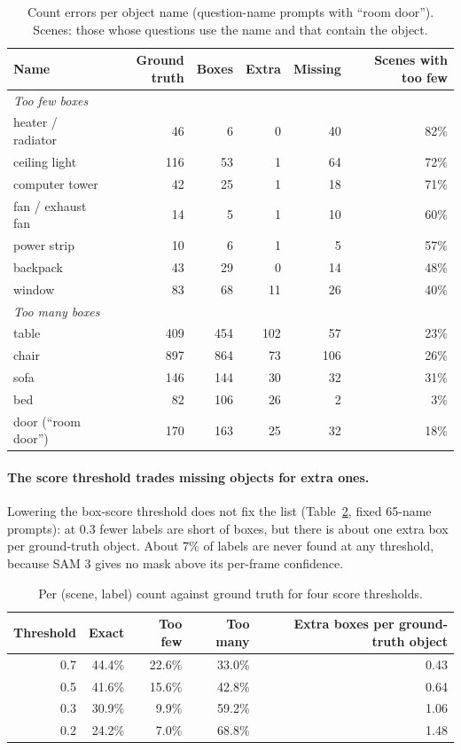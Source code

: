\begin{table}[t]
\centering
\caption{Count errors per object name (question-name prompts with ``room door''). Scenes: those whose questions
use the name and that contain the object.}
\label{tab:sam3-names}
\begin{tabular}{lrrrrr}
\toprule
Name & Ground truth & Boxes & Extra & Missing & Scenes with too few \\
\midrule
\multicolumn{6}{l}{\emph{Too few boxes}} \\
heater / radiator & 46 & 6 & 0 & 40 & 82\% \\
ceiling light     & 116 & 53 & 1 & 64 & 72\% \\
computer tower    & 42 & 25 & 1 & 18 & 71\% \\
fan / exhaust fan & 14 & 5 & 1 & 10 & 60\% \\
power strip       & 10 & 6 & 1 & 5 & 57\% \\
backpack          & 43 & 29 & 0 & 14 & 48\% \\
window            & 83 & 68 & 11 & 26 & 40\% \\
\midrule
\multicolumn{6}{l}{\emph{Too many boxes}} \\
table & 409 & 454 & 102 & 57 & 23\% \\
chair & 897 & 864 & 73 & 106 & 26\% \\
sofa  & 146 & 144 & 30 & 32 & 31\% \\
bed   & 82 & 106 & 26 & 2 & 3\% \\
door (``room door'') & 170 & 163 & 25 & 32 & 18\% \\
\bottomrule
\end{tabular}
\end{table}

\paragraph{The score threshold trades missing objects for extra ones.}
Lowering the box-score threshold does not fix the list (Table~\ref{tab:sam3-thr}, fixed 65-name prompts): at 0.3
fewer labels are short of boxes, but there is about one extra box per ground-truth object. About 7\% of labels
are never found at any threshold, because SAM 3 gives no mask above its per-frame confidence.

\begin{table}[t]
\centering
\caption{Per (scene, label) count against ground truth for four score thresholds.}
\label{tab:sam3-thr}
\begin{tabular}{rrrrr}
\toprule
Threshold & Exact & Too few & Too many & Extra boxes per ground-truth object \\
\midrule
0.7 & 44.4\% & 22.6\% & 33.0\% & 0.43 \\
0.5 & 41.6\% & 15.6\% & 42.8\% & 0.64 \\
0.3 & 30.9\% &  9.9\% & 59.2\% & 1.06 \\
0.2 & 24.2\% &  7.0\% & 68.8\% & 1.48 \\
\bottomrule
\end{tabular}
\end{table}

